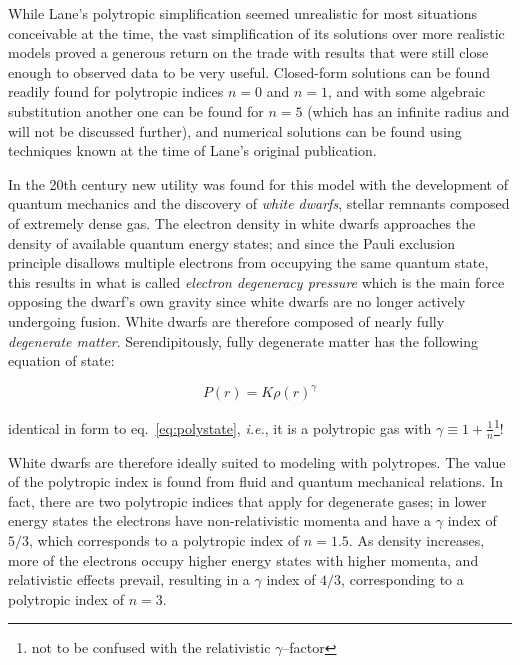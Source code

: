 \documentclass[twoside]{article}
\begin{document}
\begin{multicols}{2}
While Lane's polytropic simplification seemed unrealistic for most situations
conceivable at the time, the vast simplification of its solutions over more
realistic models proved a generous return on the trade with results that were
still close enough to observed data to be very useful. Closed-form
solutions\cite{leblanc2010} can be found readily found for polytropic indices
\(n=0\) and \(n=1\), and with some algebraic substitution another one can be
found for \(n=5\) (which has an infinite radius and will not be discussed
further), and numerical solutions can be found using techniques known at the
time of Lane's original publication.

In the 20th century new utility was found for this model with the development of
quantum mechanics and the discovery of \emph{white dwarfs}, stellar remnants
composed of extremely dense gas. The electron density in white dwarfs approaches
the density of available quantum energy states; and since the Pauli exclusion
principle disallows multiple electrons from occupying the same quantum
state\cite[p.216]{griffithsqm}, this results in what is called \emph{electron
degeneracy pressure} which is the main force opposing the dwarf's own gravity
since white dwarfs are no longer actively undergoing
fusion.\cite[pp.163--166]{hansen2004} White dwarfs are therefore composed of
nearly fully \emph{degenerate matter}. Serendipitously, fully degenerate matter
has the following equation of state:

    \begin{equation}
        \label{eq:degenstate}
        P(r)=K\rho(r)^{\gamma}
    \end{equation}

identical in form to eq.~\ref{eq:polystate}, \emph{i.e.}, it is a polytropic gas
with \(\gamma\equiv 1+\frac{1}{n}\)\footnote{not to be confused with the
relativistic \(\gamma\)--factor}!

White dwarfs are therefore ideally suited to modeling with polytropes. The
value of the polytropic index is found from fluid and quantum mechanical
relations. In fact, there are two polytropic indices that apply for degenerate
gases; in lower energy states the electrons have non-relativistic momenta and
have a \(\gamma\) index of \(5/3\), which corresponds to a polytropic index of
\(n=1.5\). As density increases, more of the electrons occupy higher energy
states with higher momenta, and relativistic effects prevail, resulting in a
\(\gamma\) index of \(4/3\), corresponding to a polytropic index of \(n=3\). 



\end{multicols}
\end{document}
